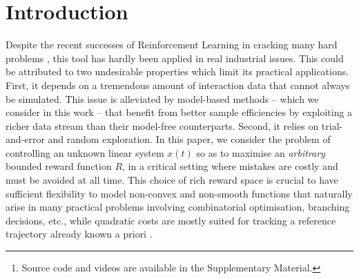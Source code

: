 \documentclass{article}
\begin{document}
\begin{abstract}
We develop a framework for the adaptive model predictive control of a linear system with unknown parameters and arbitrary bounded costs, in a critical setting where failures are costly and should be prevented at all time.  Our approach builds on two ideas: first, we incorporate prior knowledge of the dynamics in the form of a known structure that shapes uncertainty, which can be tightened as we collect interaction data by building high-confidence regions through least-square regression. Second, in order to handle this uncertainty we formulate a robust control objective. Leveraging tools from the interval prediction literature, we convert the confidence regions on parameters into confidence sets on trajectories induced by the controls. These controls are then optimised resorting to tree-based planning methods. We eventually relax our modeling assumptions with a multi-model extension based on a data-driven robust model selection mechanism. The full procedure is designed to produce reasonable and safe behaviours at deployment while recovering an asymptotic optimality. We illustrate it on a practical case of autonomous driving at a crossroads intersection among vehicles with uncertain behaviours.\footnote[2]{Source code and videos are available in the Supplementary Material.}
\end{abstract}	

\section{Introduction}

Despite the recent successes of Reinforcement Learning in cracking many hard problems \citep[e.g.][]{mnih2015humanlevel,Silver1140}, this tool has hardly been applied in real industrial issues. This could be attributed to two undesirable properties which limit its practical applications. First, it depends on a tremendous amount of interaction data that cannot always be simulated. This issue is alleviated by model-based methods -- which we consider in this work -- that benefit from better sample efficiencies by exploiting a richer data stream than their model-free counterparts. Second, it relies on trial-and-error and random exploration. In this paper, we consider the problem of controlling an unknown linear system $x(t)$ so as to maximise an \emph{arbitrary} bounded reward function $R$, in a critical setting where mistakes are costly and must be avoided at all time. 
This choice of rich reward space is crucial to have sufficient flexibility to model non-convex and non-smooth functions that naturally arise in many practical problems involving combinatorial optimisation, branching decisions, etc., while quadratic costs are mostly suited for tracking a reference trajectory already known a priori \citep[e.g.][]{Kumar2013}.
\end{document}
